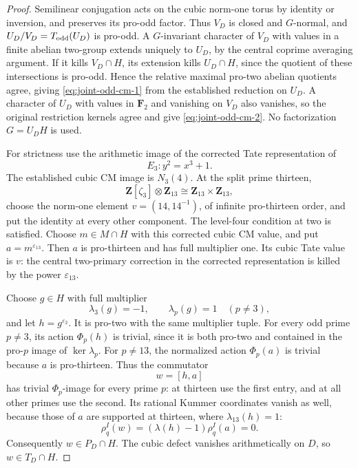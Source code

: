 \begin{proof}
Semilinear conjugation acts on the cubic norm-one torus by
identity or inversion, and preserves its pro-odd factor.
Thus \(V_D\) is closed and \(G\)-normal, and
\(U_D/V_D=T_{\rm odd}(U_D)\) is pro-odd.
A \(G\)-invariant character of \(V_D\) with values in a finite
abelian two-group extends uniquely to \(U_D\), by the central
coprime averaging argument. If it kills \(V_D\cap H\), its
extension kills \(U_D\cap H\), since the quotient of these
intersections is pro-odd.
Hence the relative maximal pro-two abelian quotients agree,
giving \eqref{eq:joint-odd-cm-1} from the established reduction on \(U_D\).
A character of \(U_D\) with values in \(\mathbf F_2\) and
vanishing on \(V_D\) also vanishes, so the original
restriction kernels agree and give \eqref{eq:joint-odd-cm-2}.
No factorization \(G=U_DH\) is used.

For strictness use the arithmetic image of the corrected
Tate representation of
\[
                         E_3:y^2=x^3+1.
\]
The established cubic CM image is \(N_3(4)\).
At the split prime thirteen,
\[
 \mathbf Z[\zeta_3]\otimes\mathbf Z_{13}
           \cong\mathbf Z_{13}\times\mathbf Z_{13},
\]
choose the norm-one element \(v=(14,14^{-1})\), of infinite
pro-thirteen order, and put the identity at every other
component. The level-four condition at two is satisfied.
Choose \(m\in M\cap H\) with this corrected cubic CM value,
and put \(a=m^{\varepsilon_{13}}\).
Then \(a\) is pro-thirteen and has full multiplier one.
Its cubic Tate value is \(v\): the central
two-primary correction in the corrected representation is
killed by the power \(\varepsilon_{13}\).

Choose \(g\in H\) with full multiplier
\[
 \lambda_3(g)=-1,\qquad
 \lambda_p(g)=1\quad(p\ne3),
\]
and let \(h=g^{\varepsilon_2}\).
It is pro-two with the same multiplier tuple.
For every odd prime \(p\ne3\), its action \(\Phi_p(h)\)
is trivial, since it is both pro-two and contained in the
pro-\(p\) image of \(\ker\lambda_p\).
For \(p\ne13\), the normalized action \(\Phi_p(a)\) is
trivial because \(a\) is pro-thirteen.
Thus the commutator
\[
                              w=[h,a]
\]
has trivial \(\Phi_p\)-image for every prime \(p\):
at thirteen use the first entry, and at all other primes
use the second.
Its rational Kummer coordinates vanish as well, because
those of \(a\) are supported at thirteen, where
\(\lambda_{13}(h)=1\):
\[
 \rho_q^I(w)
       =(\lambda(h)-1)\rho_q^I(a)=0.
\]
Consequently \(w\in P_D\cap H\).
The cubic defect vanishes arithmetically on \(D\), so
\(w\in T_D\cap H\).


\end{proof}
